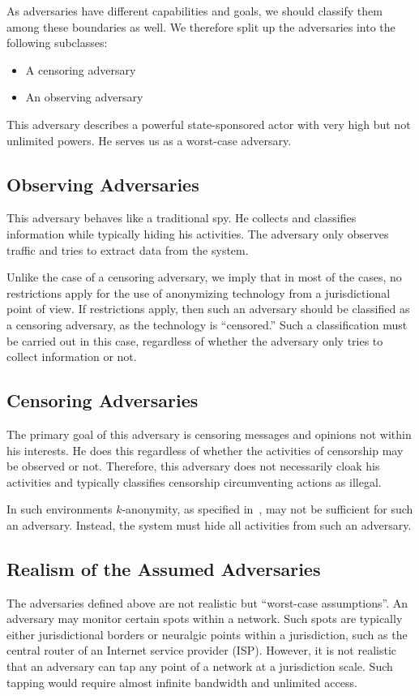 As adversaries have different capabilities and goals, we should classify them among these boundaries as well. We therefore split up the adversaries into the following subclasses:
\begin{itemize}
	\item A censoring adversary
	\item An observing adversary
\end{itemize}

This adversary describes a powerful state-sponsored actor with very high but not unlimited powers. He serves us as a worst-case adversary.

\subsection{Observing Adversaries}
This adversary behaves like a traditional spy. He collects and classifies information while typically hiding his activities. The adversary only observes traffic and tries to extract data from the system.

Unlike the case of a censoring adversary, we imply that in most of the cases, no restrictions apply for the use of anonymizing technology from a jurisdictional point of view. If restrictions apply, then such an adversary should be classified as a censoring adversary, as the technology is ``censored.'' Such a classification must be carried out in this case, regardless of whether the adversary only tries to collect information or not.

\subsection{Censoring Adversaries}
The primary goal of this adversary is censoring messages and opinions not within his interests. He does this regardless of whether the activities of censorship may be observed or not. Therefore, this adversary does not necessarily cloak his activities and typically classifies censorship circumventing actions as illegal.

In such environments $k$-anonymity, as specified in~\cite{k-anonymous:ccs2003}, may not be sufficient for such an adversary. Instead, the \MessageVortex{} system must hide all activities from such an adversary.

\subsection{Realism of the Assumed Adversaries}
The adversaries defined above are not realistic but ``worst-case assumptions''. An adversary may monitor certain spots within a network. Such spots are typically either jurisdictional borders or neuralgic points within a jurisdiction, such as the central router of an Internet service provider (ISP). However, it is not realistic that an adversary can tap any point of a network at a jurisdiction scale. Such tapping would require almost infinite bandwidth and unlimited access. 


